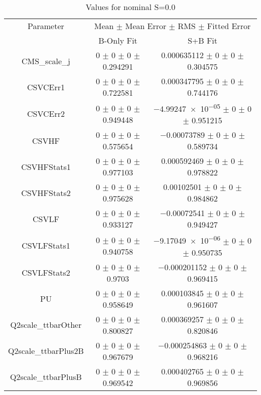 \begin{table}
\centering
\caption{Values for nominal S=0.0}
\begin{tabular}{ccc}
\toprule
Parameter & \multicolumn{2}{c}{Mean $\pm$ Mean Error $\pm$ RMS $\pm$ Fitted Error}\\
 & B-Only Fit & S+B Fit\\
\midrule
CMS\_scale\_j & \num{0} $\pm$ \num{0} $\pm$ \num{0} $\pm$ \num{0.294291} & \num{0.000635112} $\pm$ \num{0} $\pm$ \num{0} $\pm$ \num{0.304575}\\
CSVCErr1 & \num{0} $\pm$ \num{0} $\pm$ \num{0} $\pm$ \num{0.722581} & \num{0.000347795} $\pm$ \num{0} $\pm$ \num{0} $\pm$ \num{0.744176}\\
CSVCErr2 & \num{0} $\pm$ \num{0} $\pm$ \num{0} $\pm$ \num{0.949448} & \num{-4.99247e-05} $\pm$ \num{0} $\pm$ \num{0} $\pm$ \num{0.951215}\\
CSVHF & \num{0} $\pm$ \num{0} $\pm$ \num{0} $\pm$ \num{0.575654} & \num{-0.00073789} $\pm$ \num{0} $\pm$ \num{0} $\pm$ \num{0.589734}\\
CSVHFStats1 & \num{0} $\pm$ \num{0} $\pm$ \num{0} $\pm$ \num{0.977103} & \num{0.000592469} $\pm$ \num{0} $\pm$ \num{0} $\pm$ \num{0.978822}\\
CSVHFStats2 & \num{0} $\pm$ \num{0} $\pm$ \num{0} $\pm$ \num{0.975628} & \num{0.00102501} $\pm$ \num{0} $\pm$ \num{0} $\pm$ \num{0.984862}\\
CSVLF & \num{0} $\pm$ \num{0} $\pm$ \num{0} $\pm$ \num{0.933127} & \num{-0.00072541} $\pm$ \num{0} $\pm$ \num{0} $\pm$ \num{0.949427}\\
CSVLFStats1 & \num{0} $\pm$ \num{0} $\pm$ \num{0} $\pm$ \num{0.940758} & \num{-9.17049e-06} $\pm$ \num{0} $\pm$ \num{0} $\pm$ \num{0.950735}\\
CSVLFStats2 & \num{0} $\pm$ \num{0} $\pm$ \num{0} $\pm$ \num{0.9703} & \num{-0.000201152} $\pm$ \num{0} $\pm$ \num{0} $\pm$ \num{0.969415}\\
PU & \num{0} $\pm$ \num{0} $\pm$ \num{0} $\pm$ \num{0.958649} & \num{0.000103845} $\pm$ \num{0} $\pm$ \num{0} $\pm$ \num{0.961607}\\
Q2scale\_ttbarOther & \num{0} $\pm$ \num{0} $\pm$ \num{0} $\pm$ \num{0.800827} & \num{0.000369257} $\pm$ \num{0} $\pm$ \num{0} $\pm$ \num{0.820846}\\
Q2scale\_ttbarPlus2B & \num{0} $\pm$ \num{0} $\pm$ \num{0} $\pm$ \num{0.967679} & \num{-0.000254863} $\pm$ \num{0} $\pm$ \num{0} $\pm$ \num{0.968216}\\
Q2scale\_ttbarPlusB & \num{0} $\pm$ \num{0} $\pm$ \num{0} $\pm$ \num{0.969542} & \num{0.000402765} $\pm$ \num{0} $\pm$ \num{0} $\pm$ \num{0.969856}\\

\end{tabular}
\end{table}
